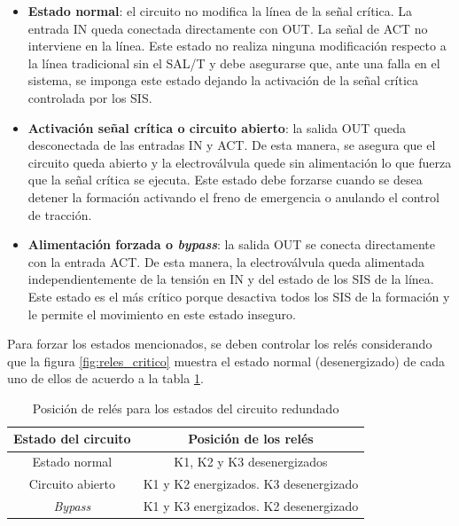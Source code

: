 \begin{itemize}
    \item \textbf{Estado normal}: el circuito no modifica la línea de la señal crítica. La entrada IN queda conectada directamente con OUT. La señal de ACT no interviene en la línea. Este estado no realiza ninguna modificación respecto a la línea tradicional sin el SAL/T y debe asegurarse que, ante una falla en el sistema, se imponga este estado dejando la activación de la señal crítica controlada por los SIS. 

    \item \textbf{Activación señal crítica o circuito abierto}: la salida OUT queda desconectada de las entradas IN y ACT. De esta manera, se asegura que el circuito queda abierto y la electroválvula quede sin alimentación lo que fuerza que la señal crítica se ejecuta. Este estado debe forzarse cuando se desea detener la formación activando el freno de emergencia o anulando el control de tracción. 

    \item \textbf{Alimentación forzada o \textit{bypass}}: la salida OUT se conecta directamente con la entrada ACT. De esta manera, la electroválvula queda alimentada independientemente de la tensión en IN y del estado de los SIS de la línea. Este estado es el más crítico porque desactiva todos los SIS de la formación y le permite el movimiento en este estado inseguro. 

\end{itemize}

Para forzar los estados mencionados, se deben controlar los relés considerando que la figura \ref{fig:reles_critico} muestra el estado normal (desenergizado) de cada uno de ellos de acuerdo a la tabla \ref{tab:estado_rele}.

\begin{table}[htb]


    \begin{tabular}{|c|c|} 
        \hline
        \textbf{Estado del circuito} & \textbf{Posición de los relés}\\
        \hline
        Estado normal     &     K1, K2 y K3 desenergizados   \\
        \hline
        Circuito abierto   &     K1 y K2 energizados. K3 desenergizado   \\
        \hline
        \textit{Bypass}   &     K1 y K3 energizados. K2 desenergizado   \\
        \hline
    \end{tabular}
\caption{Posición de relés para los estados del circuito redundado}
\label{tab:estado_rele}
\end{table}


